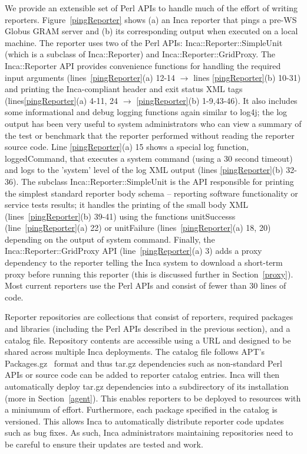 \documentclass[times,10pt,twocolumn]{article}
\begin{document}
We provide an extensible set of Perl APIs to handle much of the effort of
writing reporters.  Figure~\ref{pingReporter} shows (a) an Inca reporter that
pings a pre-WS Globus GRAM server and (b) its corresponding output when
executed on a local machine.  The reporter uses two of the Perl APIs:
Inca::Reporter::SimpleUnit (which is a subclass of Inca::Reporter) and
Inca::Reporter::GridProxy.  The Inca::Reporter API provides convenience
functions for handling the required input arguments
(lines~\ref{pingReporter}(a) 12-14 $\rightarrow$ lines \ref{pingReporter}(b)
10-31) and printing the Inca-compliant header and exit status XML tags
(lines\ref{pingReporter}(a) 4-11, 24 $\rightarrow$ \ref{pingReporter}(b)
1-9,43-46).  It also includes some informational and debug logging functions
again similar to log4j; the log output has been very useful to system
administrators who can view a summary of the test or benchmark that the
reporter performed without reading the reporter source code.  Line
\ref{pingReporter}(a) 15 shows a special log function, loggedCommand, that
executes a system command (using a 30 second timeout) and logs to the 'system'
level of the log XML output (lines \ref{pingReporter}(b) 32-36).  The subclass
Inca::Reporter::SimpleUnit is the API responsible for printing the simplest
standard reporter body schema -- reporting software functionality or service
tests results; it handles the printing of the small body XML
(lines~\ref{pingReporter}(b) 39-41) using the functions unitSuccesss
(line~\ref{pingReporter}(a) 22) or unitFailure (lines~\ref{pingReporter}(a)
18, 20) depending on the output of system command.  Finally, the
Inca::Reporter::GridProxy API (line~\ref{pingReporter}(a) 3) adds a proxy
dependency to the reporter telling the Inca system to download a
short-term proxy before running this reporter (this is discussed further in
Section~\ref{proxy}).  Most current reporters use the Perl APIs and consist of
fewer than 30 lines of code.


Reporter repositories are collections that consist of reporters, required
packages and libraries (including the Perl APIs described in the previous
section), and a catalog file.  Repository contents are accessible using a URL
and designed to be shared across multiple Inca deployments.  The catalog file
follows APT's Packages.gz~\cite{apt} format and thus tar.gz dependencies such
as non-standard Perl APIs or source code can be added to reporter catalog
entries.  Inca will then automatically deploy tar.gz dependencies into a
subdirectory of its installation (more in Section~\ref{agent}).  This enables
reporters to be deployed to resources with a miniumum of effort.  Furthermore,
each package specified in the catalog is versioned.  This allows Inca to
automatically distribute reporter code updates such as bug fixes.  As such,
Inca administrators maintaining repositories need to be careful to ensure
their updates are tested and work.
\end{document}
